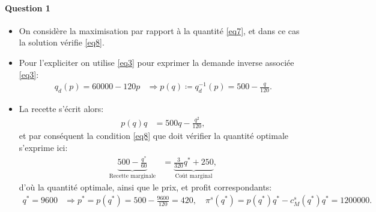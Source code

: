 \documentclass[notes, ignorenonframetext, compress, 9pt, xcolor=svgnames, aspectratio=169]{beamer}
\begin{document}
\begin{frame}
  [allowframebreaks]{\insertsection}
  \framesubtitle{Question 1}
  \begin{itemize}
  \item On considère la maximisation par rapport à la quantité \eqref{eq7}, et dans ce cas la solution vérifie \eqref{eq8}.
  \item Pour l'expliciter on utilise \eqref{eq3} pour exprimer la demande inverse associée \eqref{eq3}:
  \begin{align*}
  q_d(p) = 60000 - 120p &\Rightarrow p(q) \coloneqq q_d^{-1}(p) =500- \frac{q}{120}.
  \end{align*}
 \item La recette s'écrit alors:
 \begin{align*}
p(q)q &= 500q -  \frac{q^2}{120},
 \end{align*}
 et par conséquent  la condition \eqref{eq8}  que doit vérifier la quantité optimale s'exprime ici:
 \begin{align*}
\underbrace{ 500 - \frac{q^*}{60}}_{\text{Recette marginale}} &=  \underbrace{\frac{3}{320}q^* + 250}_{\text{Coût marginal}},
 \end{align*}
 d'où la quantité optimale, ainsi que le prix, et profit correspondants:
  \begin{align*}
  q^* = 9600 &\Rightarrow p^*  = p(q^*) = 500 - \frac{9600}{120}= 420, \quad \pi^s(q^*) = p(q^*)q^* - c_M^s(q^*) q^* = 1200000.
   \end{align*}
  \end{itemize}
   \end{frame}
   
\end{document}
